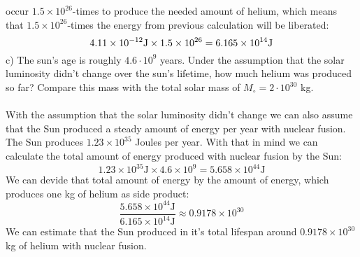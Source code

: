 occur $1.5 \times 10^{26}$-times to produce the needed amount of helium, which means that 
$1.5 \times 10^{26}$-times the energy from previous calculation will be liberated:
\begin{equation*}
    4.11 \times 10^{-12} \text{J} \times 1.5 \times 10^{26} = 6.165 \times 10^{14} \text{J}\\
\end{equation*}
c) The sun's age is roughly $4.6 \cdot 10^9$ years. Under the assumption that the solar luminosity didn't
change over the sun's lifetime, how much helium was produced so far? Compare this mass with the total 
solar mass of $M_{\circ} = 2 \cdot 10^{30}$ kg.\\
\\
With the assumption that the solar luminosity didn't change we can also assume that the Sun produced a 
steady amount of energy per year with nuclear fusion. The Sun produces $1.23 \times 10^{35}$ Joules per
year. With that in mind we can calculate the total amount of energy produced with nuclear fusion by the
Sun:
\begin{equation*}
    1.23 \times 10^{35} \text{J} \times 4.6 \times 10^9 = 5.658 \times 10^{44} \text{J}
\end{equation*}
We can devide that total amount of energy by the amount of energy, which produces one kg of helium as side
product:
\begin{equation*}
    \frac{5.658 \times 10^{44} \text{J}}{6.165 \times 10^{14} \text{J}} \approx 0.9178 \times 10^{30}
\end{equation*}
We can estimate that the Sun produced in it's total lifespan around $0.9178 \times 10^{30}$ kg of helium
with nuclear fusion.
